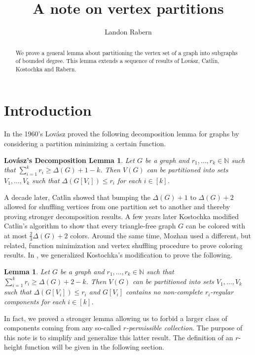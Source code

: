 \documentclass[12pt]{amsart}
\title{A note on vertex partitions}
\author{Landon Rabern}
\theoremstyle{plain}
\newtheorem{lem}[thm]{Lemma}
\newtheorem*{LovaszLemma}{Lov\'{a}sz's Decomposition Lemma}
\theoremstyle{definition}
\theoremstyle{remark}
\newcommand{\IN}{\mathbb{N}}
\newcommand{\irange}[1]{\left[#1\right]}
\begin{document}
\begin{abstract}
We prove a general lemma about partitioning the vertex set of a graph into subgraphs of bounded degree.  This lemma extends a sequence of results of Lov\'{a}sz, Catlin, Kostochka and Rabern.
\end{abstract}
\maketitle
\section{Introduction}
In the 1960's Lov\'{a}sz \cite{Lovasz} proved the following decomposition lemma for graphs by considering a partition minimizing a certain function.

\begin{LovaszLemma}
Let $G$ be a graph and $r_1, \ldots, r_k \in \IN$ such that $\sum_{i=1}^k r_i \geq \Delta(G) + 1 - k$. Then $V(G)$ can be partitioned into sets $V_1, \ldots, V_k$ such that $\Delta(G[V_i]) \leq r_i$ for each $i \in \irange{k}$.
\end{LovaszLemma}

A decade later, Catlin \cite{Catlin} showed that bumping the $\Delta(G) + 1$ to $\Delta(G) + 2$ allowed for shuffling vertices from one partition set to another and thereby proving stronger decomposition results. A few years later Kostochka \cite{Kostochka} modified Catlin's algorithm to show that every triangle-free graph $G$ can be colored with at most $\frac23 \Delta(G) + 2$ colors.  Around the same time, Mozhan \cite{Mozhan} used a different, but related, function minimization and vertex shuffling procedure to prove coloring results.  In \cite{rabern}, we generalized Kostochka's modification to prove the following.

\begin{lem}\label{LandonsLemma}
Let $G$ be a graph and $r_1, \ldots, r_k \in \IN$ such that $\sum_{i=1}^k r_i \geq \Delta(G) + 2 - k$. Then $V(G)$ can be partitioned into sets $V_1, \ldots, V_k$ such that $\Delta(G[V_i]) \leq r_i$ and $G[V_i]$ contains no non-complete $r_i$-regular components for each $i \in \irange{k}$.
\end{lem}

In fact, we proved a stronger lemma allowing us to forbid a larger class of components coming from any so-called \emph{$r$-permissible collection}.  The purpose of this note is to simplify and generalize this latter result.  The definition of an $r$-height function will be given in the following section.
\end{document}
